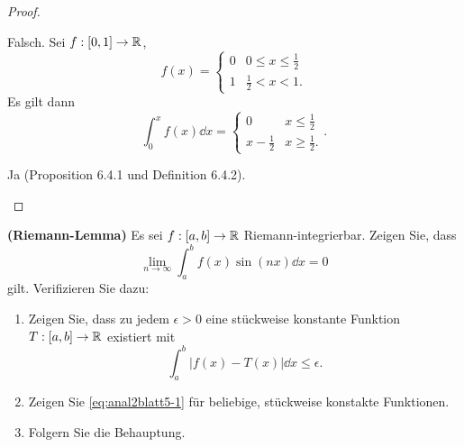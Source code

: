 \begin{proof}
	\begin{parts}
	\item Falsch. Sei $f:[0,1]\to \mathbb{R}$,
		\[
		f(x)=\begin{cases}
			0 & 0 \le x \le \frac{1}{2}\\
			1 & \frac{1}{2}< x < 1.
		\end{cases}
	\]
	Es gilt dann
	\[
		\int_0^x f(x)\dd{x}=\begin{cases}
			0 & x\le \frac{1}{2}\\
			x-\frac{1}{2} & x\ge \frac{1}{2}.
		\end{cases}
	.\] 
\item Ja (Proposition 6.4.1 und Definition 6.4.2).
	\end{parts}
\end{proof}
\begin{Problem}
	\textbf{(Riemann-Lemma)} Es sei $f:[a,b]\to \mathbb{R}$ Riemann-integrierbar. Zeigen Sie, dass
	\begin{equation}\tag{5.1}\label{eq:anal2blatt5-1}
		\lim_{n \to \infty} \int_a^b f(x)\sin(nx)\dd{x}=0
	\end{equation}
		gilt. Verifizieren Sie dazu:
		\begin{enumerate}[label=(\roman*)]
			\item Zeigen Sie, dass zu jedem $\epsilon>0$ eine stückweise konstante Funktion $T : [a, b] \to \mathbb{R}$ existiert mit
				\[
					\int_a^b |f(x)-T(x)|\dd{x}\le\epsilon
				.\] 
			\item Zeigen Sie \eqref{eq:anal2blatt5-1} f\"{u}r beliebige, stückweise konstakte Funktionen.
			\item Folgern Sie die Behauptung.
		\end{enumerate}
\end{Problem}
